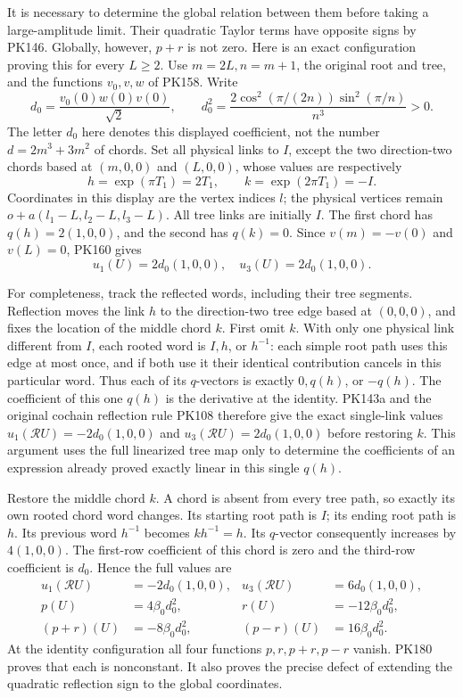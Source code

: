 \documentclass[11pt]{article}
\begin{document}
It is necessary to determine the global relation between them before
taking a large-amplitude limit. Their quadratic Taylor terms have
opposite signs by PK146. Globally, however, \(p+r\) is not zero.
Here is an exact configuration proving this for every \(L\ge2\).
Use \(m=2L,n=m+1\), the original root and tree, and the functions
\(v_0,v,w\) of PK158. Write
\[
 d_0=\frac{v_0(0)w(0)v(0)}{\sqrt2},\qquad
 d_0^2=\frac{2\cos^2(\pi/(2n))\sin^2(\pi/n)}{n^3}>0.
 \tag{PK179}
\]
The letter \(d_0\) here denotes this displayed coefficient, not the
number \(d=2m^3+3m^2\) of chords.
Set all physical links to \(I\), except the two direction-two chords
based at \((m,0,0)\) and \((L,0,0)\), whose values are respectively
\[
 h=\exp(\pi T_1)=2T_1,\qquad
 k=\exp(2\pi T_1)=-I .
\]
Coordinates in this display are the vertex indices \(l\); the physical
vertices remain \(o+a(l_1-L,l_2-L,l_3-L)\).
All tree links are initially \(I\). The first chord has
\(q(h)=2(1,0,0)\), and the second has \(q(k)=0\).
Since \(v(m)=-v(0)\) and \(v(L)=0\), PK160 gives
\[
 u_1(U)=2d_0(1,0,0),\quad u_3(U)=2d_0(1,0,0).
\]

For completeness, track the reflected words, including their tree
segments. Reflection moves the link \(h\) to the direction-two
tree edge based at \((0,0,0)\), and fixes the location of the
middle chord \(k\). First omit \(k\). With only one physical link
different from \(I\), each rooted word is \(I,h\), or \(h^{-1}\):
each simple root path uses this edge at most once, and if both use
it their identical contribution cancels in this particular word.
Thus each of its \(q\)-vectors is exactly \(0,q(h)\), or \(-q(h)\).
The coefficient of this one \(q(h)\) is the derivative at the identity.
PK143a and the original cochain reflection rule PK108 therefore give
the exact single-link values
\(u_1(\mathcal RU)=-2d_0(1,0,0)\) and
\(u_3(\mathcal RU)=2d_0(1,0,0)\) before restoring \(k\).
This argument uses the full linearized tree map only to determine
the coefficients of an expression already proved exactly linear
in this single \(q(h)\).

Restore the middle chord \(k\). A chord is absent from every tree
path, so exactly its own rooted chord word changes.
Its starting root path is \(I\); its ending root path is \(h\).
Its previous word \(h^{-1}\) becomes \(kh^{-1}=h\).
Its \(q\)-vector consequently increases by \(4(1,0,0)\).
The first-row coefficient of this chord is zero and the third-row
coefficient is \(d_0\). Hence the full values are
\[
 \begin{aligned}
 u_1(\mathcal RU)&=-2d_0(1,0,0),&
 u_3(\mathcal RU)&=6d_0(1,0,0),\\
 p(U)&=4\beta_0d_0^2,&
 r(U)&=-12\beta_0d_0^2,\\
 (p+r)(U)&=-8\beta_0d_0^2,&
 (p-r)(U)&=16\beta_0d_0^2 .
 \end{aligned}\tag{PK180}
\]
At the identity configuration all four functions \(p,r,p+r,p-r\)
vanish. PK180 proves that each is nonconstant. It also proves the
precise defect of extending the quadratic reflection sign to the
global coordinates.
\end{document}
